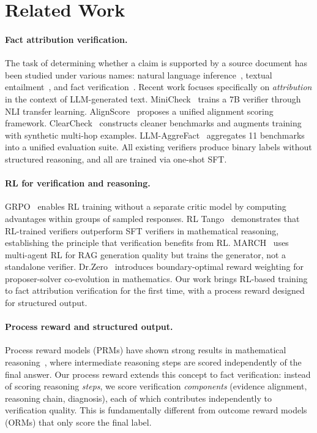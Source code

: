 \documentclass{article}
\begin{document}
\section{Related Work}
\label{sec:related}

\paragraph{Fact attribution verification.}
The task of determining whether a claim is supported by a source document has been studied under various names: natural language inference~\citep{bowman2015snli}, textual entailment~\citep{dagan2005pascal}, and fact verification~\citep{thorne2018fever}.
Recent work focuses specifically on \emph{attribution} in the context of LLM-generated text.
MiniCheck~\citep{tang2024minicheck} trains a 7B verifier through NLI transfer learning.
AlignScore~\citep{zha2023alignscore} proposes a unified alignment scoring framework.
ClearCheck~\citep{seo2025vtv} constructs cleaner benchmarks and augments training with synthetic multi-hop examples.
LLM-AggreFact~\citep{tang2024llmaggrefact} aggregates 11 benchmarks into a unified evaluation suite.
All existing verifiers produce binary labels without structured reasoning, and all are trained via one-shot SFT.

\paragraph{RL for verification and reasoning.}
GRPO~\citep{shao2024deepseekmath} enables RL training without a separate critic model by computing advantages within groups of sampled responses.
RL Tango~\citep{zha2025tango} demonstrates that RL-trained verifiers outperform SFT verifiers in mathematical reasoning, establishing the principle that verification benefits from RL.
MARCH~\citep{li2026march} uses multi-agent RL for RAG generation quality but trains the generator, not a standalone verifier.
Dr.Zero~\citep{chen2025drzero} introduces boundary-optimal reward weighting for proposer-solver co-evolution in mathematics.
Our work brings RL-based training to fact attribution verification for the first time, with a process reward designed for structured output.

\paragraph{Process reward and structured output.}
Process reward models (PRMs) have shown strong results in mathematical reasoning~\citep{lightman2024lets, wang2024math}, where intermediate reasoning steps are scored independently of the final answer.
Our process reward extends this concept to fact verification: instead of scoring reasoning \emph{steps}, we score verification \emph{components} (evidence alignment, reasoning chain, diagnosis), each of which contributes independently to verification quality.
This is fundamentally different from outcome reward models (ORMs) that only score the final label.
\end{document}
